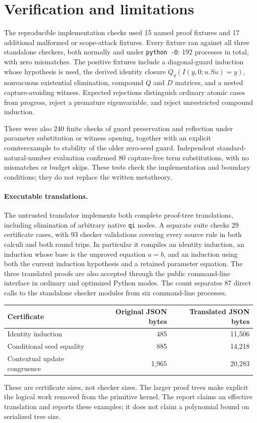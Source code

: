 \documentclass[11pt]{article}
\theoremstyle{definition}
\theoremstyle{remark}
\begin{document}
\section{Verification and limitations}
\label{sec:validation}

The reproducible implementation checks used 15 named proof fixtures and 17 additional malformed or scope-attack fixtures. Every fixture ran against all three standalone checkers, both normally and under \texttt{python -O}: 192 processes in total, with zero mismatches. The positive fixtures include a diagonal-guard induction whose hypothesis is used, the derived identity closure $Q_y(I(y,0;u.Su)=y)$, nonvacuous existential elimination, compound $Q$ and $D$ matrices, and a nested capture-avoiding witness. Expected rejections distinguish ordinary atomic cases from progress, reject a premature eigenvariable, and reject unrestricted compound induction.

There were also 240 finite checks of guard preservation and reflection under parameter substitution or witness opening, together with an explicit counterexample to stability of the older zero-seed guard. Independent standard-natural-number evaluation confirmed 80 capture-free term substitutions, with no mismatches or budget skips. These tests check the implementation and boundary conditions; they do not replace the written metatheory.


\paragraph{Executable translations.}
The untrusted translator implements both complete proof-tree translations,
including elimination of arbitrary native \texttt{qi} nodes. A separate
suite checks 29 certificate cases, with 93 checker validations covering
every source rule in both calculi and both round trips. In particular it
compiles an identity induction, an induction whose base is the unproved
equation \(a=b\), and an induction using both the current induction
hypothesis and a retained parameter equation. The three translated
proofs are also accepted through the public command-line interface in
ordinary and optimized Python modes. The count separates 87 direct calls
to the standalone checker modules from six command-line processes.

\begin{center}\small
\begin{tabular}{@{}lrr@{}}
\toprule
Certificate & Original JSON bytes & Translated JSON bytes\\
\midrule
Identity induction & 485 & 11,506\\
Conditional seed equality & 885 & 14,218\\
Contextual update congruence & 1,965 & 20,283\\
\bottomrule
\end{tabular}
\end{center}
These are certificate sizes, not checker sizes. The larger proof trees
make explicit the logical work removed from the primitive kernel. The
report claims an effective translation and reports these examples; it
does not claim a polynomial bound on serialized tree size.
\end{document}
